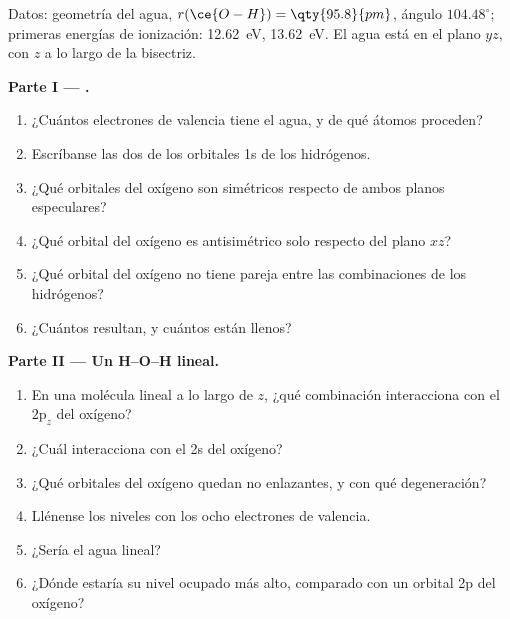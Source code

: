 \begin{problem}
\label{pb:b2:fragment-orbitals:1}
Datos: geometría del agua, $r(\ce{O-H}) = \qty{95.8}{pm}$, ángulo
$104.48^\circ$; primeras energías de ionización:  \qty{12.62}{eV}, 
\qty{13.62}{eV}. El agua está en el plano $yz$, con $z$ a lo largo de la bisectriz.

\medskip
\noindent\textbf{Parte I --- .}
\begin{enumerate}
  \item ¿Cuántos electrones de valencia tiene el agua, y de qué átomos proceden?
  \item Escríbanse las dos  de los orbitales 1s de los hidrógenos.
  \item ¿Qué orbitales del oxígeno son simétricos respecto de ambos planos especulares?
  \item ¿Qué orbital del oxígeno es antisimétrico solo respecto del plano $xz$?
  \item ¿Qué orbital del oxígeno no tiene pareja entre las combinaciones de los hidrógenos?
  \item ¿Cuántos  resultan, y cuántos están llenos?
\end{enumerate}

\medskip
\noindent\textbf{Parte II --- Un H--O--H lineal.}
\begin{enumerate}[resume]
  \item En una molécula lineal a lo largo de $z$, ¿qué combinación interacciona con el
        $2\mathrm p_z$ del oxígeno?
  \item ¿Cuál interacciona con el 2s del oxígeno?
  \item ¿Qué orbitales del oxígeno quedan no enlazantes, y con qué degeneración?
  \item Llénense los niveles con los ocho electrones de valencia.
  \item ¿Sería  el agua lineal?
  \item ¿Dónde estaría su nivel ocupado más alto, comparado con un orbital 2p del
        oxígeno?
\end{enumerate}


\end{problem}
